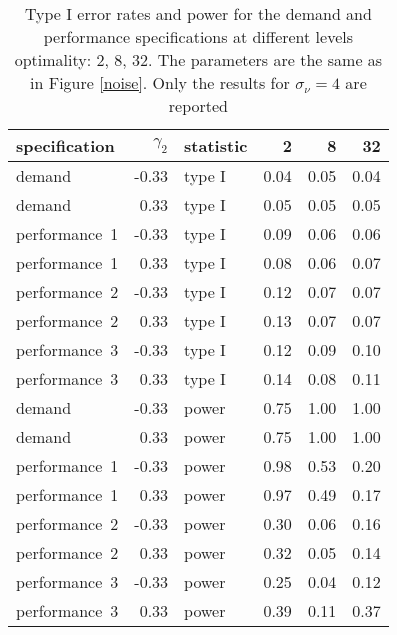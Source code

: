 \begin{table}[ht]
\centering
\begingroup\footnotesize
\begin{tabular}{lrlrrr}
  \hline
specification & $\gamma_2$ & statistic & 2 & 8 & 32 \\ 
  \hline
demand & -0.33 & type I & 0.04 & 0.05 & 0.04 \\ 
  demand & 0.33 & type I & 0.05 & 0.05 & 0.05 \\ 
  performance~1 & -0.33 & type I & 0.09 & 0.06 & 0.06 \\ 
  performance~1 & 0.33 & type I & 0.08 & 0.06 & 0.07 \\ 
  performance~2 & -0.33 & type I & 0.12 & 0.07 & 0.07 \\ 
  performance~2 & 0.33 & type I & 0.13 & 0.07 & 0.07 \\ 
  performance~3 & -0.33 & type I & 0.12 & 0.09 & 0.10 \\ 
  performance~3 & 0.33 & type I & 0.14 & 0.08 & 0.11 \\ 
  demand & -0.33 & power & 0.75 & 1.00 & 1.00 \\ 
  demand & 0.33 & power & 0.75 & 1.00 & 1.00 \\ 
  performance~1 & -0.33 & power & 0.98 & 0.53 & 0.20 \\ 
  performance~1 & 0.33 & power & 0.97 & 0.49 & 0.17 \\ 
  performance~2 & -0.33 & power & 0.30 & 0.06 & 0.16 \\ 
  performance~2 & 0.33 & power & 0.32 & 0.05 & 0.14 \\ 
  performance~3 & -0.33 & power & 0.25 & 0.04 & 0.12 \\ 
  performance~3 & 0.33 & power & 0.39 & 0.11 & 0.37 \\ 
   \hline
\end{tabular}
\endgroup
\caption{Type I error rates and power for the demand 
  and performance specifications at different levels optimality: 
  2, 8, 32. The parameters are the same as in Figure \ref{noise}.
  Only the results for $\sigma_{\nu} = 4$ are reported} 
\label{noise-table}
\end{table}
